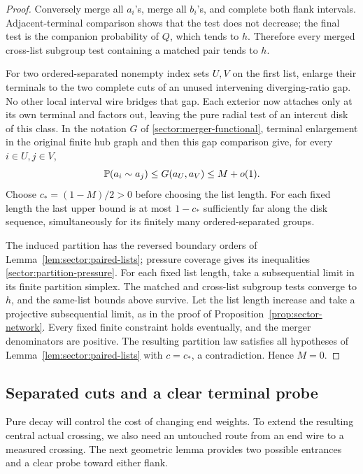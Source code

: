 \begin{proof}
Conversely merge all \(a_i\)'s, merge all \(b_i\)'s,
and complete both flank intervals.  Adjacent-terminal
comparison shows that the test does not decrease; the final test is the
companion probability of \(Q\), which tends to \(h\).  Therefore
every merged cross-list subgroup test containing a
matched pair tends to \(h\).

For two ordered-separated nonempty index sets \(U,V\) on the first
list, enlarge their terminals to the two complete cuts of an unused
intervening diverging-ratio gap.  No other local interval wire bridges
that gap.  Each exterior now attaches only at its own terminal and
factors out, leaving the pure radial test of an intercut disk of this
class.  In the notation \(G\) of \eqref{sector:merger-functional},
terminal enlargement in the original finite hub graph and then this
gap comparison give, for every \(i\in U,j\in V\),
\[
 \mathbb P(a_i\sim a_j)\le G(a_U,a_V)\le M+o(1).
\]
Choose \(c_*=(1-M)/2>0\) before choosing the list length.  For each
fixed length the last upper bound is at most \(1-c_*\) sufficiently
far along the disk sequence, simultaneously for its finitely many
ordered-separated groups.

The induced partition has the reversed boundary orders of
Lemma~\ref{lem:sector:paired-lists}; pressure coverage gives its
inequalities \eqref{sector:partition-pressure}.  For each fixed list
length, take a subsequential limit in its finite partition simplex.
The matched and cross-list subgroup tests converge to \(h\), and the
same-list bounds above survive.  Let the list length increase and take
a projective subsequential limit, as in the proof of
Proposition~\ref{prop:sector-network}.  Every fixed finite constraint holds
eventually, and the merger denominators are positive.  The resulting
partition law satisfies all hypotheses of
Lemma~\ref{lem:sector:paired-lists} with \(c=c_*\), a contradiction.
Hence \(M=0\).
\end{proof}

\subsection{Separated cuts and a clear terminal probe}

Pure decay will control the cost of changing end weights.  To extend
the resulting central actual crossing, we also need an untouched route
from an end wire to a measured crossing.  The next geometric lemma
provides two possible entrances and a clear probe toward either flank.


